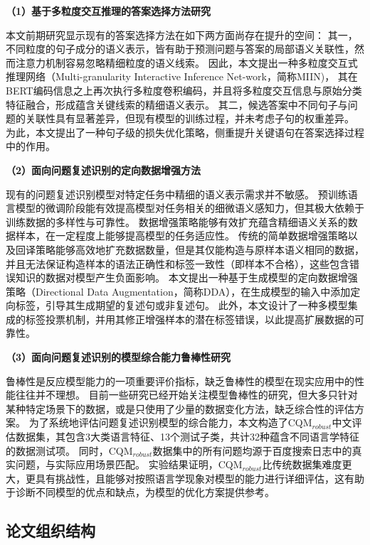 \textbf{\songti （1）基于多粒度交互推理的答案选择方法研究}

本文前期研究显示现有的答案选择方法在如下两方面尚存在提升的空间：
其一，不同粒度的句子成分的语义表示，皆有助于预测问题与答案的局部语义关联性，然而注意力机制容易忽略精细粒度的语义线索。
因此，本文提出一种多粒度交互式推理网络（Multi-granularity Interactive Inference Net-work，简称MIIN)，
其在BERT编码信息之上再次执行多粒度卷积编码，并且将多粒度交互信息与原始分类特征融合，形成蕴含关键线索的精细语义表示。
其二，候选答案中不同句子与问题的关联性具有显著差异，但现有模型的训练过程，并未考虑子句的权重差异。
为此，本文提出了一种句子级的损失优化策略，侧重提升关键语句在答案选择过程中的作用。

\textbf{\songti （2）面向问题复述识别的定向数据增强方法}

现有的问题复述识别模型对特定任务中精细的语义表示需求并不敏感。
预训练语言模型的微调阶段能有效提高模型对任务相关的细微语义感知力，但其极大依赖于训练数据的多样性与可靠性。
数据增强策略能够有效扩充蕴含精细语义关系的数据样本，在一定程度上能够提高模型的任务适应性。
传统的简单数据增强策略以及回译策略能够高效地扩充数据数量，但是其仅能构造与原样本语义相同的数据，并且无法保证构造样本的语法正确性和标签一致性（即样本不合格），这些包含错误知识的数据对模型产生负面影响。
本文提出一种基于生成模型的定向数据增强策略（Directional Data Augmentation，简称DDA），在生成模型的输入中添加定向标签，引导其生成期望的复述句或非复述句。
此外，本文设计了一种多模型集成的标签投票机制，并用其修正增强样本的潜在标签错误，以此提高扩展数据的可靠性。

\textbf{\songti （3）面向问题复述识别的模型综合能力鲁棒性研究}

鲁棒性是反应模型能力的一项重要评价指标，缺乏鲁棒性的模型在现实应用中的性能往往并不理想。
目前一些研究已经开始关注模型鲁棒性的研究，但大多只针对某种特定场景下的数据，或是只使用了少量的数据变化方法，缺乏综合性的评估方案。
为了系统地评估问题复述识别模型的综合能力，本文构造了CQM$_{robust}$中文评估数据集，其包含3大类语言特征、13个测试子类，共计32种蕴含不同语言学特征的数据测试项。
同时，CQM$_{robust}$数据集中的所有问题均源于百度搜索日志中的真实问题，与实际应用场景匹配。
实验结果证明，CQM$_{robust}$比传统数据集难度更大，更具有挑战性，且能够对按照语言学现象对模型的能力进行详细评估，这有助于诊断不同模型的优点和缺点，为模型的优化方案提供参考。


\subsection{论文组织结构}

